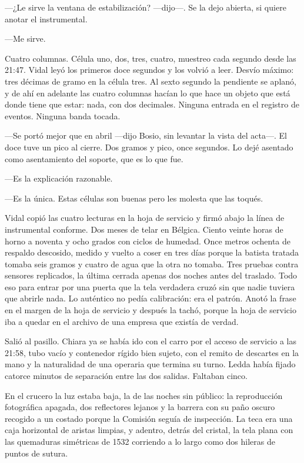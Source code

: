 ---¿Le sirve la ventana de estabilización? ---dijo---. Se la dejo abierta, si quiere anotar el instrumental.

---Me sirve.

Cuatro columnas. Célula uno, dos, tres, cuatro, muestreo cada segundo desde las 21:47. Vidal leyó los primeros doce segundos y los volvió a leer. Desvío máximo: tres décimas de gramo en la célula tres. Al sexto segundo la pendiente se aplanó, y de ahí en adelante las cuatro columnas hacían lo que hace un objeto que está donde tiene que estar: nada, con dos decimales. Ninguna entrada en el registro de eventos. Ninguna banda tocada.

---Se portó mejor que en abril ---dijo Bosio, sin levantar la vista del acta---. El doce tuve un pico al cierre. Dos gramos y pico, once segundos. Lo dejé asentado como asentamiento del soporte, que es lo que fue.

---Es la explicación razonable.

---Es la única. Estas células son buenas pero les molesta que las toqués.

Vidal copió las cuatro lecturas en la hoja de servicio y firmó abajo la línea de instrumental conforme. Dos meses de telar en Bélgica. Ciento veinte horas de horno a noventa y ocho grados con ciclos de humedad. Once metros ochenta de respaldo descosido, medido y vuelto a coser en tres días porque la batista tratada tomaba seis gramos y cuatro de agua que la otra no tomaba. Tres pruebas contra sensores replicados, la última cerrada apenas dos noches antes del traslado. Todo eso para entrar por una puerta que la tela verdadera cruzó sin que nadie tuviera que abrirle nada. Lo auténtico no pedía calibración: era el patrón. Anotó la frase en el margen de la hoja de servicio y después la tachó, porque la hoja de servicio iba a quedar en el archivo de una empresa que existía de verdad.

Salió al pasillo. Chiara ya se había ido con el carro por el acceso de servicio a las 21:58, tubo vacío y contenedor rígido bien sujeto, con el remito de descartes en la mano y la naturalidad de una operaria que termina su turno. Ledda había fijado catorce minutos de separación entre las dos salidas. Faltaban cinco.

En el crucero la luz estaba baja, la de las noches sin público: la reproducción fotográfica apagada, dos reflectores lejanos y la barrera con su paño oscuro recogido a un costado porque la Comisión seguía de inspección. La teca era una caja horizontal de aristas limpias, y adentro, detrás del cristal, la tela plana con las quemaduras simétricas de 1532 corriendo a lo largo como dos hileras de puntos de sutura.

